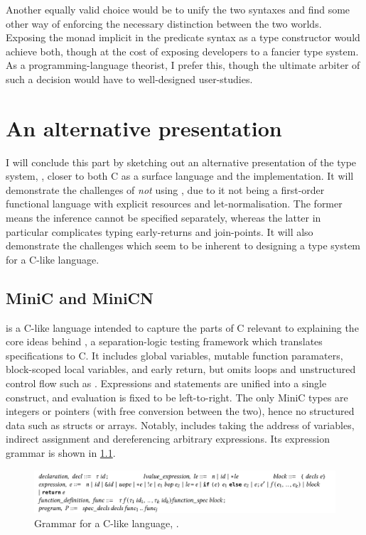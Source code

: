 Another equally valid choice would be to unify the two syntaxes and find some
other way of enforcing the necessary distinction between the two worlds.
Exposing the monad implicit in the predicate syntax as a type constructor would
achieve both, though at the cost of exposing developers to a fancier type
system. As a programming-language theorist, I prefer this, though the ultimate
arbiter of such a decision would have to well-designed user-studies.

\chapter{An alternative presentation}\label{chap:kernel-alternative}

I will conclude this part by sketching out an alternative presentation of the
 type system, , closer to both C as a surface language and
the  implementation. It will demonstrate the challenges of \emph{not}
using , due to it not being a first-order functional
language with explicit resources and let-normalisation. The former means the
inference cannot be specified separately, whereas the latter in particular
complicates typing early-returns and join-points. It will also demonstrate the
challenges which seem to be inherent to designing a type system for a C-like
language.

\section{MiniC and MiniCN}

 is a C-like language intended to capture the parts of C relevant to
explaining the core ideas behind
, a separation-logic testing
framework which translates  specifications to C. It includes global
variables, mutable function paramaters, block-scoped local variables, and early
return, but omits loops and unstructured control flow such as .
Expressions and statements are unified into a single construct, and evaluation
is fixed to be left-to-right. The only MiniC types are integers or pointers
(with free conversion between the two), hence no structured data such as
structs or arrays. Notably,  includes taking the address of
variables, indirect assignment and dereferencing arbitrary expressions. Its
expression grammar is shown in \cref{fig:minic-grammar}.

\begin{figure}[tp]
    \includegraphics{figures/mini-c-grammar}
    \caption{Grammar for a C-like language, .}\label{fig:minic-grammar}
\end{figure}

